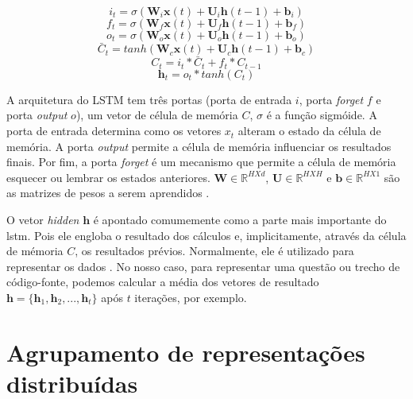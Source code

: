 \begin{equation}
    i_{t} = \sigma(\bm{W}_{i}\bm{x}(t) + \bm{U}_{i}\bm{h}(t - 1) + \bm{b}_{i})
\end{equation}
\begin{equation}
    f_{t} = \sigma(\bm{W}_{f}\bm{x}(t) + \bm{U}_{f}\bm{h}(t - 1) + \bm{b}_{f})
\end{equation}
\begin{equation}
    o_{t} = \sigma(\bm{W}_{o}\bm{x}(t) + \bm{U}_{o}\bm{h}(t - 1) + \bm{b}_{o})
\end{equation}
\begin{equation}
    \bar{C}_{t} = tanh(\bm{W}_{c}\bm{x}(t) + \bm{U}_{c}\bm{h}(t - 1) + \bm{b}_{c})
\end{equation}
\begin{equation}
    C_{t} = i_{t} * \bar{C}_t + f_{t} * C_{t - 1}
\end{equation}
\begin{equation}
    \bm{h}_{t} = o_{t} * tanh(C_{t})
\end{equation}

A arquitetura do LSTM tem três portas (porta de entrada $i$, porta \textit{forget} $f$ e porta \textit{output} $o$), um vetor de célula de memória $C$, $\sigma$ é a função sigmóide. A porta de entrada determina como os vetores $x_{t}$ alteram o estado da célula de memória. A porta \textit{output} permite a célula de memória influenciar os resultados finais. Por fim, a porta \textit{forget} é um mecanismo que permite a célula de memória esquecer ou lembrar os estados anteriores. $\bm{W} \in \mathbb{R}^{H X d}$, $\bm{U} \in \mathbb{R}^{H X H}$ e $\bm{b} \in \mathbb{R}^{H X 1}$ são as matrizes de pesos a serem aprendidos \citep{tan-lstm-qa}.

O vetor \textit{hidden} $\bm{h}$ é apontado comumemente como a parte mais importante do \acrshort{lstm}. Pois ele engloba o resultado dos cálculos e, implicitamente, através da célula de mémoria $C$, os resultados prévios. Normalmente, ele é utilizado para representar os dados \citep{tom-young:trends-deep-learning-nlp}.
No nosso caso, para representar uma questão ou trecho de código-fonte, podemos calcular a média dos vetores de resultado $\bm{h} = \{ \bm{h}_{1}, \bm{h}_{2}, . . ., \bm{h}_t \}$ após $t$ iterações, por exemplo.

\section{Agrupamento de representações distribuídas}


